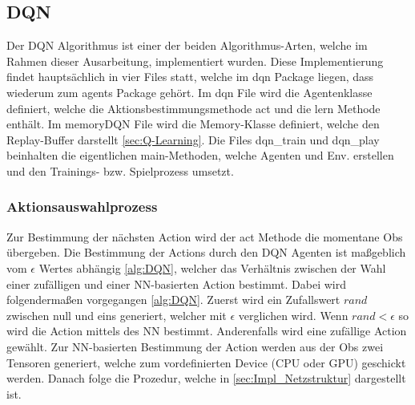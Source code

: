 \subsection{DQN}
Der DQN Algorithmus ist einer der beiden Algorithmus-Arten, welche im Rahmen dieser Ausarbeitung, implementiert wurden. Diese Implementierung findet hauptsächlich in vier Files statt, welche im dqn Package liegen, dass wiederum zum agents Package gehört.
Im dqn File wird die Agentenklasse definiert, welche die Aktionsbestimmungsmethode act und die lern Methode enthält. 
Im memoryDQN File wird die Memory-Klasse definiert, welche den Replay-Buffer darstellt \ref{sec:Q-Learning}. 
Die Files dqn\_train und dqn\_play beinhalten die eigentlichen main-Methoden, welche Agenten und Env. erstellen und den Trainings- bzw. Spielprozess umsetzt.

\subsubsection{Aktionsauswahlprozess}
Zur Bestimmung der nächsten Action wird der act Methode die momentane Obs übergeben.
Die Bestimmung der Actions durch den DQN Agenten ist maßgeblich vom $\epsilon$ Wertes abhängig \ref{alg:DQN}, welcher das Verhältnis zwischen der Wahl einer zufälligen und einer NN-basierten Action bestimmt. Dabei wird folgendermaßen vorgegangen \ref{alg:DQN}.
Zuerst wird ein Zufallswert $rand$ zwischen null und eins generiert, welcher mit $\epsilon$ verglichen wird. Wenn $rand < \epsilon$ so wird die Action mittels des NN bestimmt. Anderenfalls wird eine zufällige Action gewählt.
Zur NN-basierten Bestimmung der Action werden aus der Obs zwei Tensoren generiert, welche zum vordefinierten Device (CPU oder GPU) geschickt werden. Danach folge die Prozedur, welche in \ref{sec:Impl_Netzstruktur} dargestellt ist.

